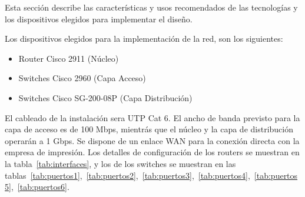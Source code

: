 \documentclass[a4paper,onecolumn,11pt]{article}
\begin{document}
Esta sección describe las características y usos recomendados de las tecnologías y los dispositivos elegidos para implementar el diseño.

Los dispositivos elegidos para la implementación de la red, son los siguientes:
\begin{itemize}
\item Router Cisco 2911	(Núcleo)
\item Switches Cisco 2960 (Capa Acceso)
\item Switches Cisco SG-200-08P	  (Capa Distribución)
\end{itemize}

El cableado de la instalación sera UTP Cat 6. El ancho de banda previsto para la capa de acceso es de 100 Mbps, mientrás que el núcleo y la capa de distribución operarán a 1 Gbps. Se dispone de un enlace WAN para la conexión directa con la empresa de impresión.
Los detalles de configuración de los routers se muestran en la tabla~\ref{tab:interfaces}, y los de los switches se muestran en las tablas~\ref{tab:puertos1},~\ref{tab:puertos2},~\ref{tab:puertos3},~\ref{tab:puertos4},~\ref{tab:puertos5},~\ref{tab:puertos6}.
\end{document}
